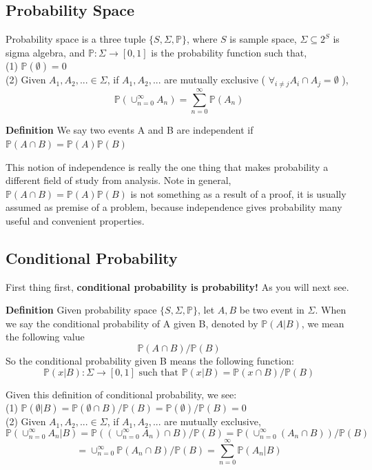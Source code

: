 \documentclass[a4paper,12pt]{article}
\begin{document}
\subsection{Probability Space}
Probability space is a three tuple
$\{ S, \Sigma,  \mathbb{P}\}$,
where $S$ is sample space, $\Sigma\subseteq 2^S$ is sigma algebra, and $\mathbb{P}: \Sigma \to [0, 1]$ is the probability function such that,\\
(1) $\mathbb{P}(\emptyset) = 0$\\
(2) Given $A_1, A_2, ... \in \Sigma$, if $A_1, A_2, ...$ are mutually exclusive ( $\forall_{i\neq j} A_i \cap A_j = \emptyset$ ), $$\mathbb{P}( \cup_{n=0}^\infty A_n ) = \sum_{n=0}^\infty \mathbb{P}(A_n)$$

\textbf{Definition} We say two events A and B are independent if $\mathbb{P}(A\cap B) = \mathbb{P}(A)\mathbb{P}(B)$

This notion of independence is really the one thing that makes probability a different field of study from analysis. Note in general, $\mathbb{P}(A\cap B) = \mathbb{P}(A)\mathbb{P}(B)$ is not something as a result of a proof, it is usually assumed as premise of a problem, because independence gives probability many useful and convenient properties. 

\subsection{Conditional Probability}
First thing first, \textbf{conditional probability is probability!} As you will next see.

\textbf{Definition} Given probability space $\{ S, \Sigma,  \mathbb{P}\}$, let $A, B$ be two event in $\Sigma$. When we say the conditional probability of A given B, denoted by $\mathbb{P}(A|B) $, we mean the following value $$\mathbb{P}(A\cap B)/\mathbb{P}(B)$$
So the conditional probability given B means the following function:
$$\mathbb{P}(x|B): \Sigma \to [0, 1] \text{ such that } \mathbb{P}(x|B) = \mathbb{P}(x\cap B)/\mathbb{P}(B)$$

Given this definition of conditional probability, we see:\\
(1) $\mathbb{P}(\emptyset|B) = \mathbb{P}(\emptyset\cap B)/\mathbb{P}(B) = \mathbb{P}(\emptyset)/\mathbb{P}(B) = 0$\\
(2) Given $A_1, A_2, ... \in \Sigma$, if $A_1, A_2, ...$ are mutually exclusive, $$\mathbb{P}( \cup_{n=0}^\infty A_n |B ) = \mathbb{P}( (\cup_{n=0}^\infty A_n) \cap B ) /  \mathbb{P}(B)= \mathbb{P}( \cup_{n=0}^\infty (A_n \cap B) ) /  \mathbb{P}(B)$$
$$= \cup_{n=0}^\infty \mathbb{P} ( A_n \cap B ) / \mathbb{P}(B) = \sum_{n=0}^\infty \mathbb{P}(A_n | B)$$\\
\end{document}
